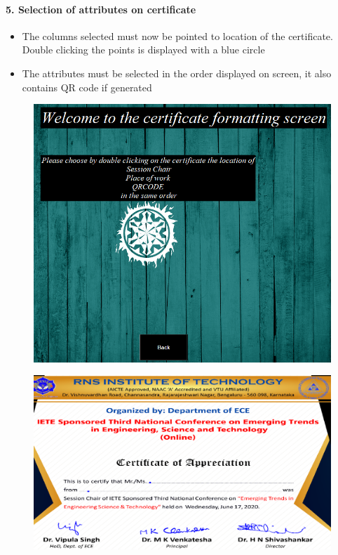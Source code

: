 \newpage
\paragraph{5. Selection of attributes on certificate}

\begin{itemize}
	\item The columns selected must now be pointed to location of the certificate. Double clicking the points is displayed with a blue circle
	\item The attributes must be selected in the order displayed on screen, it also contains QR code if generated
\end{itemize}

\begin{figure}[H]
	\centering
	\includegraphics[width=0.65\linewidth]{"images/generation_qr_nqr/Screenshot (56)"}
	\label{fig:screenshot-56}
\end{figure}


\begin{figure}[H]
	\centering
	\includegraphics[width=0.8\linewidth]{"images/generation_qr_nqr/Screenshot (54)"}
	\label{fig:screenshot-54}
\end{figure}


